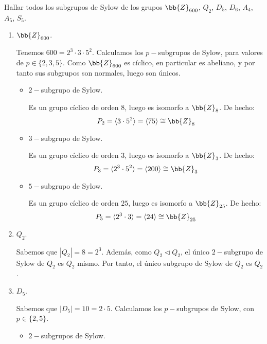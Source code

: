 \begin{ejercicio}\label{ej:6.21}
    Hallar todos los subgrupos de Sylow de los grupos $\bb{Z}_{600}$, $Q_2$, $D_5$, $D_6$, $A_4$, $A_5$, $S_5$.
    \begin{enumerate}
        \item $\bb{Z}_{600}$.
        
        Tenemos $600=2^3\cdot 3\cdot 5^2$. Calculamos los $p-$subgrupos de Sylow, para valores de $p\in \{2,3,5\}$. Como $\bb{Z}_{600}$ es cíclico, en particular es abeliano, y por tanto sus subgrupos son normales, luego son únicos.
        \begin{itemize}
            \item $2-$subgrupo de Sylow.
            
            Es un grupo cíclico de orden $8$, luego es isomorfo a $\bb{Z}_8$. De hecho:
            \begin{equation*}
                P_2 = \langle 3\cdot 5^2 \rangle = \langle 75 \rangle \cong \bb{Z}_8
            \end{equation*}

            \item $3-$subgrupo de Sylow.
            
            Es un grupo cíclico de orden $3$, luego es isomorfo a $\bb{Z}_3$. De hecho:
            \begin{equation*}
                P_3 = \langle 2^3\cdot 5^2 \rangle = \langle 200 \rangle \cong \bb{Z}_3
            \end{equation*}
            \item $5-$subgrupo de Sylow.
            
            Es un grupo cíclico de orden $25$, luego es isomorfo a $\bb{Z}_{25}$. De hecho:
            \begin{equation*}
                P_5 = \langle 2^3\cdot 3 \rangle = \langle 24 \rangle \cong \bb{Z}_{25}
            \end{equation*}
        \end{itemize}

        \item $Q_2$.
        
        Sabemos que $|Q_2|=8=2^3$. Además, como $Q_2\lhd Q_2$, el único $2-$subgrupo de Sylow de $Q_2$ es $Q_2$ mismo. Por tanto, el único subgrupo de Sylow de $Q_2$ es $Q_2$.

        \item $D_5$.
        
        Sabemos que $|D_5|=10=2\cdot 5$. Calculamos los $p-$subgrupos de Sylow, con $p\in \{2,5\}$.
        \begin{itemize}
            \item $2-$subgrupos de Sylow.
            

\end{itemize}
\end{enumerate}
\end{ejercicio}
